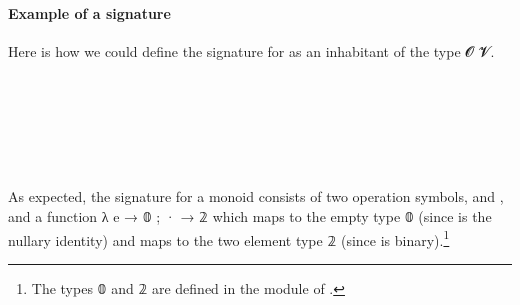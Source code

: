 \paragraph*{Example of a signature} %
Here is how we could define the signature for  as an inhabitant of the type  \ab 𝓞 \ab 𝓥.
\ccpad
\begin{code}%
\>[1]\AgdaSpace{}%
\AgdaSpace{}%
\AgdaSymbol{:}\AgdaSpace{}%
\AgdaSpace{}%
\AgdaSpace{}%
\<%
\\
\>[1][@{}l@{\AgdaIndent{0}}]%
\>[2]\AgdaSpace{}%
\AgdaSymbol{:}\AgdaSpace{}%
\<%
\\
%
\>[2]\AgdaSpace{}%
\AgdaSymbol{:}\AgdaSpace{}%
\<%
\\
%
\\[\AgdaEmptyExtraSkip]%
%
\>[1]\AgdaSpace{}%
\AgdaSymbol{:}\AgdaSpace{}%
\AgdaSpace{}%
\AgdaSpace{}%
\<%
\\
%
\>[1]\AgdaSpace{}%
\AgdaSymbol{=}\AgdaSpace{}%
\AgdaSpace{}%
\AgdaOperator{\AgdaInductiveConstructor{,}}\AgdaSpace{}%
\AgdaSpace{}%
\AgdaSymbol{\{}\AgdaSpace{}%
\AgdaSpace{}%
\AgdaSpace{}%
\AgdaSymbol{;}\AgdaSpace{}%
\AgdaSpace{}%
\AgdaSpace{}%
\AgdaSpace{}%
\AgdaSymbol{\}}\<%
\end{code}
\ccpad
As expected, the signature for a monoid consists of two operation symbols,  and , and a function
\as λ \as{\{} \aic e \as → \af 𝟘 \as ; \aic · \as → \af 𝟚 \as{\}} which maps  to the empty type \af 𝟘 (since  is the nullary identity) and maps  to the two element type \af 𝟚 (since  is binary).\footnote{The types \af 𝟘 and \af 𝟚 are defined in the  module of \typtop.}

